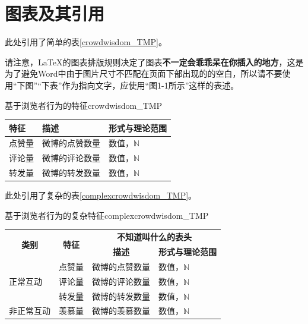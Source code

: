 \documentclass[a4paper,AutoFakeBold,oneside,12pt]{book}
\begin{document}
\section{图表及其引用}
此处引用了简单的表\ref{crowdwisdom_TMP}。

请注意，\LaTeX{}的图表排版规则决定了图表\textbf{不一定会乖乖呆在你插入的地方}，这是为了避免Word中由于图片尺寸不匹配在页面下部出现的的空白，所以请不要使用“下图”“下表”作为指向文字，应使用“图1-1所示”这样的表述。

\begin{bupttable}{基于浏览者行为的特征}{crowdwisdom_TMP}

    \begin{tabular}{l|l|l}
		\hline \textbf{特征} & \textbf{描述} & \textbf{形式与理论范围}\\
		\hline 点赞量 & 微博的点赞数量 & 数值，$\mathbb{N}$ \\
		\hline 评论量 & 微博的评论数量 & 数值，$\mathbb{N}$ \\
		\hline 转发量 & 微博的转发数量 & 数值，$\mathbb{N}$ \\
		\hline
    \end{tabular}
\end{bupttable}

此处引用了复杂的表\ref{complexcrowdwisdom_TMP}。


\begin{bupttable}{基于浏览者行为的复杂特征}{complexcrowdwisdom_TMP}
    \begin{tabular}{l|l|l|l}
        \hline
        \multicolumn{1}{c|}{\multirow{2}{*}{\textbf{类别}}} & \multicolumn{1}{c|}{\multirow{2}{*}{\textbf{特征}}} & \multicolumn{2}{c}{\textbf{不知道叫什么的表头}} \\
        \cline{3-4}
        & & \multicolumn{1}{c|}{\textbf{描述}} & \multicolumn{1}{c}{\textbf{形式与理论范围}} \\
        \hline
        \multirow{3}{*}{正常互动} & 点赞量 & 微博的点赞数量 & 数值，$\mathbb{N}$ \\
        \cline{2-4}
        & 评论量 & 微博的评论数量 & 数值，$\mathbb{N}$ \\
        \cline{2-4}
        & 转发量 & 微博的转发数量 & 数值，$\mathbb{N}$ \\
        \hline
        非正常互动 & 羡慕量 & 微博的羡慕数量 & 数值，$\mathbb{N}$ \\
        \hline
    \end{tabular}
\end{bupttable}
\end{document}
